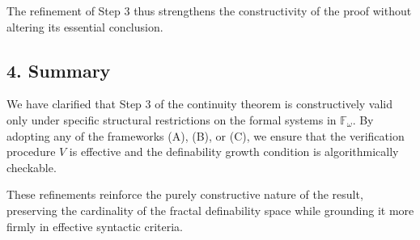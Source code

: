 \documentclass[12pt]{article}
\theoremstyle{definition}
\theoremstyle{plain}
\theoremstyle{remark}
\begin{document}
The refinement of Step 3 thus strengthens the constructivity of the proof without altering its essential conclusion.

\subsection*{4. Summary}

We have clarified that Step 3 of the continuity theorem is constructively valid only under specific structural restrictions on the formal systems in \( \mathbb{F}_\omega \). By adopting any of the frameworks (A), (B), or (C), we ensure that the verification procedure \( V \) is effective and the definability growth condition is algorithmically checkable.

These refinements reinforce the purely constructive nature of the result, preserving the cardinality of the fractal definability space while grounding it more firmly in effective syntactic criteria.
\end{document}
